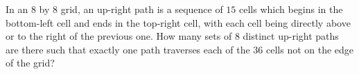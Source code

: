 In an $8$ by $8$ grid, an up-right path is a sequence of $15$ cells which begins in the bottom-left cell and ends in the top-right cell, with each cell being directly above or to the right of the previous one. How many sets of $8$ distinct up-right paths are there such that exactly one path traverses each of the $36$ cells not on the edge of the grid?
